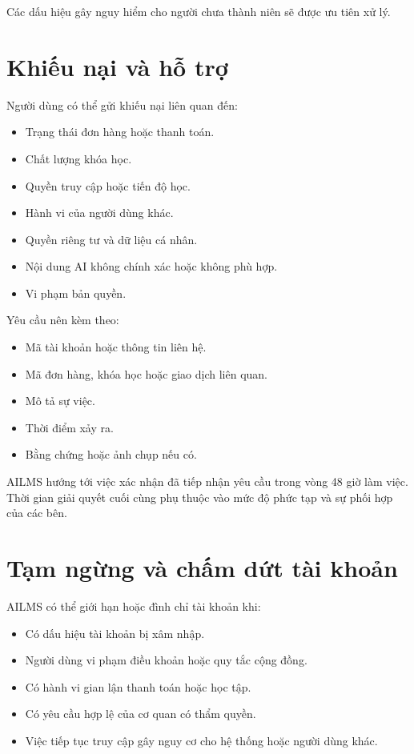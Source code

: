 \documentclass[12pt,a4paper]{article}
\begin{document}
Các dấu hiệu gây nguy hiểm cho người chưa thành niên sẽ được ưu tiên xử lý.

\section{Khiếu nại và hỗ trợ}

Người dùng có thể gửi khiếu nại liên quan đến:

\begin{itemize}
    \item Trạng thái đơn hàng hoặc thanh toán.
    \item Chất lượng khóa học.
    \item Quyền truy cập hoặc tiến độ học.
    \item Hành vi của người dùng khác.
    \item Quyền riêng tư và dữ liệu cá nhân.
    \item Nội dung AI không chính xác hoặc không phù hợp.
    \item Vi phạm bản quyền.
\end{itemize}

Yêu cầu nên kèm theo:

\begin{itemize}
    \item Mã tài khoản hoặc thông tin liên hệ.
    \item Mã đơn hàng, khóa học hoặc giao dịch liên quan.
    \item Mô tả sự việc.
    \item Thời điểm xảy ra.
    \item Bằng chứng hoặc ảnh chụp nếu có.
\end{itemize}

AILMS hướng tới việc xác nhận đã tiếp nhận yêu cầu trong vòng 48 giờ làm việc.
Thời gian giải quyết cuối cùng phụ thuộc vào mức độ phức tạp và sự phối hợp của các bên.

\section{Tạm ngừng và chấm dứt tài khoản}

AILMS có thể giới hạn hoặc đình chỉ tài khoản khi:

\begin{itemize}
    \item Có dấu hiệu tài khoản bị xâm nhập.
    \item Người dùng vi phạm điều khoản hoặc quy tắc cộng đồng.
    \item Có hành vi gian lận thanh toán hoặc học tập.
    \item Có yêu cầu hợp lệ của cơ quan có thẩm quyền.
    \item Việc tiếp tục truy cập gây nguy cơ cho hệ thống hoặc người dùng khác.
\end{itemize}
\end{document}
